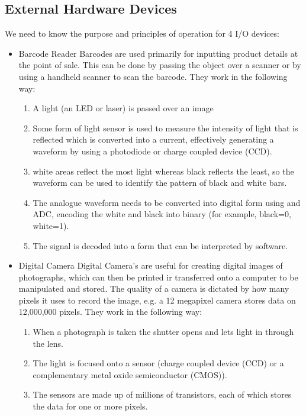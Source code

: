 \subsection{External Hardware Devices}
  \noindent
  We need to know the purpose and principles of operation for 4 I/O devices:
  \begin{itemize}
    \setlength{\itemsep}{0em}
    \item Barcode Reader
      \subitem Barcodes are used primarily for inputting product details at the point of sale. This can be done by passing the object over a scanner or by using a handheld scanner to scan the barcode. They work in the following way:
      \begin{enumerate}
        \setlength{\itemsep}{0em}
        \item A light (an LED or laser) is passed over an image
        \item Some form of light sensor is used to measure the intensity of light that is reflected which is converted into a current, effectively generating a waveform by using a photodiode or charge coupled device (CCD).
        \item white areas reflect the most light whereas black reflects the least, so the waveform can be used to identify the pattern of black and white bars.
        \item The analogue waveform needs to be converted into digital form using and ADC, encoding the white and black into binary (for example, black=0, white=1).
        \item The signal is decoded into a form that can be interpreted by software.
      \end{enumerate}
    \item Digital Camera
      \subitem Digital Camera's are useful for creating digital images of photographs, which can then be printed ir transferred onto a computer to be manipulated and stored. The quality of a camera is dictated by how many pixels it uses to record the image, e.g. a 12 megapixel camera stores data on 12,000,000 pixels. They work in the following way:
      \begin{enumerate}
        \setlength{\itemsep}{0em}
        \item When a photograph is taken the shutter opens and lets light in through the lens.
        \item The light is focused onto a sensor (charge coupled device (CCD) or a complementary metal oxide semiconductor (CMOS)).
        \item The sensors are made up of millions of transistors, each of which stores the data for one or more pixels.

\end{enumerate}
\end{itemize}
